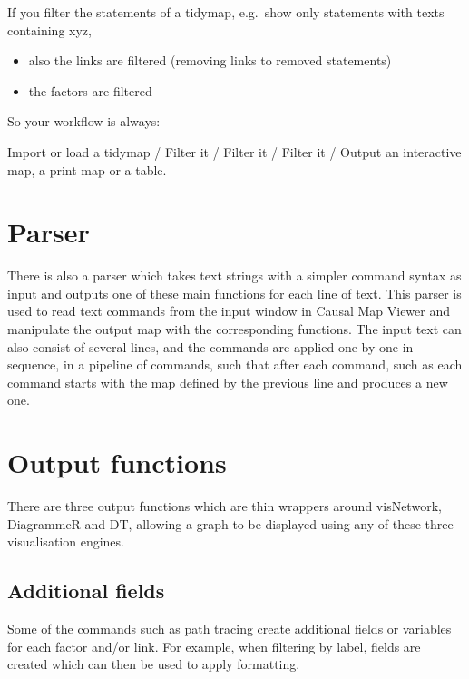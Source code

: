 \documentclass[
]{book}
\providecommand{\tightlist}{%
  \setlength{\itemsep}{0pt}\setlength{\parskip}{0pt}}
\begin{document}
If you filter the statements of a tidymap, e.g.~show only statements with texts containing xyz,

\begin{itemize}
\tightlist
\item
  also the links are filtered (removing links to removed statements)
\item
  the factors are filtered
\end{itemize}

So your workflow is always:

Import or load a tidymap / Filter it / Filter it / Filter it / Output an interactive map, a print map or a table.

\hypertarget{parser}{%
\section{\texorpdfstring{\textbf{Parser}}{Parser}}\label{parser}}

There is also a parser which takes text strings with a simpler command syntax as input and outputs one of these main functions for each line of text. This parser is used to read text commands from the input window in Causal Map Viewer and manipulate the output map with the corresponding functions. The input text can also consist of several lines, and the commands are applied one by one in sequence, in a pipeline of commands, such that after each command, such as each command starts with the map defined by the previous line and produces a new one.

\hypertarget{output-functions}{%
\section{\texorpdfstring{\textbf{Output functions}}{Output functions}}\label{output-functions}}

There are three output functions which are thin wrappers around visNetwork, DiagrammeR and DT, allowing a graph to be displayed using any of these three visualisation engines.

\hypertarget{additional-fields}{%
\subsection{\texorpdfstring{\textbf{Additional fields}}{Additional fields}}\label{additional-fields}}

Some of the commands such as path tracing create additional fields or variables for each factor and/or link. For example, when filtering by label, fields are created which can then be used to apply formatting.
\end{document}
